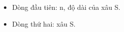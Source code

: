 \begin{itemize}
	\item     Dòng đầu tiên: n, độ dài của xâu S.   
	\item     Dòng thứ hai: xâu S.   
\end{itemize}

\